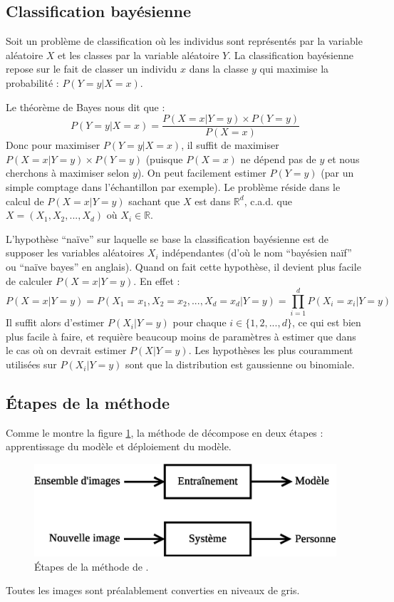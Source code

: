 \subsection{Classification bayésienne}
Soit un problème de classification où les individus sont représentés
par la variable aléatoire $X$ et les classes par la variable aléatoire $Y$.
La classification bayésienne repose sur le fait de classer un individu $x$ dans la
classe $y$ qui maximise la probabilité : $P(Y=y|X=x)$.

Le théorème de Bayes nous dit que :
\[
    P(Y=y|X=x) = \frac{P(X=x|Y=y) \times P(Y=y)}{P(X=x)}
\]
Donc pour maximiser $P(Y=y|X=x)$, il suffit de maximiser $P(X=x|Y=y) \times P(Y=y)$
(puisque $P(X=x)$ ne dépend pas de $y$ et nous cherchons à maximiser selon $y$).
On peut facilement estimer $P(Y=y)$ (par un simple comptage dans l'échantillon par exemple).
Le problème réside dans le calcul de $P(X=x|Y=y)$ sachant que $X$ est dans $\mathbb{R}^d$, 
c.a.d. que $X = (X_1, X_2, ..., X_d)$ où $X_i \in \mathbb{R}$.

L'hypothèse ``naïve'' sur laquelle se base la classification bayésienne est de supposer
les variables aléatoires $X_i$ indépendantes (d'où le nom ``bayésien naïf'' ou ``naïve bayes''
en anglais). Quand on fait cette hypothèse, il devient plus facile de calculer $P(X=x|Y=y)$.
En effet :
\[
    P(X=x|Y=y) = P(X_1=x_1, X_2=x_2, ..., X_d=x_d|Y=y) = \prod_{i=1}^d P(X_i=x_i|Y=y)
\]
Il suffit alors d'estimer $P(X_i|Y=y)$ pour chaque $i \in \{1, 2, ..., d\}$, ce qui est bien
plus facile à faire, et requière beaucoup moins de paramètres à estimer que dans le cas où
on devrait estimer $P(X|Y=y)$. Les hypothèses les plus couramment utilisées sur $P(X_i|Y=y)$
sont que la distribution est gaussienne ou binomiale.


\subsection{Étapes de la méthode}
Comme le montre la figure \ref{fig:article:etapes}, la méthode de décompose en deux 
étapes : apprentissage du modèle et déploiement du modèle.
\begin{figure}[H]
    \centering
    \includegraphics[scale=0.5]{images/article_etapes}
    \caption{Étapes de la méthode de \cite{article}.}
    \label{fig:article:etapes}
\end{figure}
Toutes les images sont préalablement converties en niveaux de gris.

